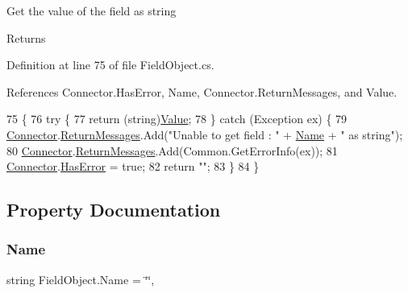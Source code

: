 Get the value of the field as string 

\begin{DoxyReturn}{Returns}

\end{DoxyReturn}


Definition at line 75 of file Field\+Object.\+cs.



References Connector.\+Has\+Error, Name, Connector.\+Return\+Messages, and Value.


\begin{DoxyCode}
75                                      \{
76         \textcolor{keywordflow}{try} \{
77             \textcolor{keywordflow}{return} (\textcolor{keywordtype}{string})\mbox{\hyperlink{class_field_object_a9764fb1824cec95b82cd6ac0b4cd8919}{Value}};
78         \} \textcolor{keywordflow}{catch} (Exception ex) \{
79             \mbox{\hyperlink{class_connector}{Connector}}.\mbox{\hyperlink{class_connector_a1ed422674b344524fd77998dcf6a9ba6}{ReturnMessages}}.Add(\textcolor{stringliteral}{"Unable to get field : "} + 
      \mbox{\hyperlink{class_field_object_ae5d972e96a3eca93407da8e8a89abfd1}{Name}} + \textcolor{stringliteral}{" as string"});
80             \mbox{\hyperlink{class_connector}{Connector}}.\mbox{\hyperlink{class_connector_a1ed422674b344524fd77998dcf6a9ba6}{ReturnMessages}}.Add(Common.GetErrorInfo(ex));
81             \mbox{\hyperlink{class_connector}{Connector}}.\mbox{\hyperlink{class_connector_a9365777a6b7b711b75bcfa6c4d53e989}{HasError}} = \textcolor{keyword}{true};
82             \textcolor{keywordflow}{return} \textcolor{stringliteral}{""};
83         \}
84     \}
\end{DoxyCode}


\subsection{Property Documentation}
\mbox{\label{class_field_object_ae5d972e96a3eca93407da8e8a89abfd1}} 
\subsubsection{\texorpdfstring{Name}{Name}}
{\footnotesize\ttfamily string Field\+Object.\+Name = \char`\"{}\char`\"{}\hspace{0.3cm}{\ttfamily [get]}, {\ttfamily [set]}}



